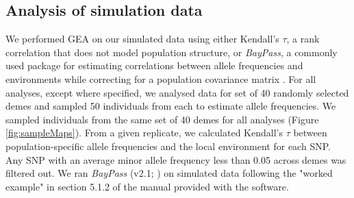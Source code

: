 \documentclass[10pt,twoside,lineno]{GSA_format}
\begin{document}






\subsection{Analysis of simulation data}

We performed GEA on our simulated data using either Kendall's $\tau$, a rank correlation that does not model population structure, or \textit{BayPass}, a commonly used package for estimating correlations between allele frequencies and environments while correcting for a population covariance matrix \citep{Gautier2015}. For all analyses, except where specified, we analysed data for set of 40 randomly selected demes and sampled 50 individuals from each to estimate allele frequencies. We sampled individuals from the same set of 40 demes for all analyses (Figure \ref{fig:sampleMaps}). From a given replicate, we calculated Kendall's $\tau$ between population-specific allele frequencies and the local environment for each SNP. Any SNP with an average minor allele frequency less than 0.05 across demes was filtered out. We ran \textit{BayPass} (v2.1; \citealt{Gautier2015}) on simulated data following the "worked example" in section 5.1.2 of the manual provided with the software. \\
\end{document}
